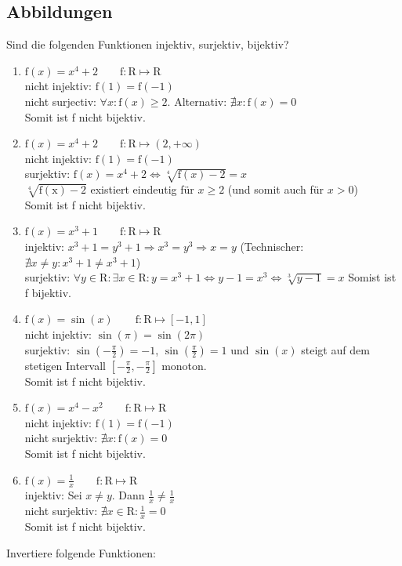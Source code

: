 \documentclass[11pt, a4paper]{article}
\begin{document}
\subsection{Abbildungen}
Sind die folgenden Funktionen injektiv, surjektiv, bijektiv?
\begin{enumerate}
	\item $\mathrm{f}(x) = x^4+2 \qquad \mathrm{f}: \mathrm{R} \mapsto \mathrm{R}$ \\
	nicht injektiv: $\mathrm{f}(1) = \mathrm{f}(-1)$ \\
	nicht surjectiv: $\forall x: \mathrm{f}(x) \geq 2$. Alternativ: $\nexists x: \mathrm{f}(x) = 0$ \\
	Somit ist f nicht bijektiv.
	\item $\mathrm{f}(x) = x^4+2 \qquad \mathrm{f}: \mathrm{R} \mapsto (2, + \infty)$ \\
	nicht injektiv: $\mathrm{f}(1) = \mathrm{f}(-1)$ \\
	surjektiv: $\mathrm{f}(x) = x^4 + 2 \Leftrightarrow \sqrt[4]{\mathrm{f}(x) - 2} = x$ \\
	$\sqrt[4]{\mathrm{f(x)}-2}$ existiert eindeutig für $x \geq 2$ (und somit auch für $x > 0$) \\
	Somit ist f nicht bijektiv.
	\item $\mathrm{f}(x) = x^3+1 \qquad \mathrm{f}: \mathrm{R} \mapsto \mathrm{R}$ \\
	injektiv: $x^3 + 1 = y^3 + 1 \Rightarrow x^3 = y^3 \Rightarrow x = y$ (Technischer: $\nexists x \neq y: x^3 + 1 \neq x^3 + 1$) \\
	surjektiv: $\forall y \in \mathrm{R}: \exists x \in \mathrm{R}: y = x^3 + 1 \Leftrightarrow y - 1 = x^3 \Leftrightarrow \sqrt[3]{y-1} = x$
	Somist ist f bijektiv.
	\item $\mathrm{f}(x) = \sin(x) \qquad \mathrm{f}: \mathrm{R} \mapsto [-1, 1]$ \\
	nicht injektiv: $\sin(\pi) = \sin(2 \pi)$ \\
	surjektiv: $\sin\left(-\frac{\pi}{2}\right) = -1$, $\sin\left(\frac{\pi}{2}\right) = 1$ und $\sin(x)$ steigt auf dem stetigen Intervall $\left[-\frac{\pi}{2},-\frac{\pi}{2}\right]$ monoton. \\
	Somit ist f nicht bijektiv.
	\item $\mathrm{f}(x) = x^4 - x^2 \qquad \mathrm{f}: \mathrm{R} \mapsto \mathrm{R}$ \\
	nicht injektiv: $\mathrm{f}(1) = \mathrm{f}(-1)$ \\
	nicht surjektiv: $\nexists x: \mathrm{f}(x) = 0$ \\
	Somit ist f nicht bijektiv.
	\item $\mathrm{f}(x) = \frac{1}{x} \qquad \mathrm{f}: \mathrm{R} \mapsto \mathrm{R}$ \\
	injektiv: Sei $x \neq y$. Dann $\frac{1}{x} \neq \frac{1}{x}$ \\
	nicht surjektiv: $\nexists x \in \mathrm{R}: \frac{1}{x} = 0$ \\
	Somit ist f nicht bijektiv.
\end{enumerate}
Invertiere folgende Funktionen:
\end{document}
